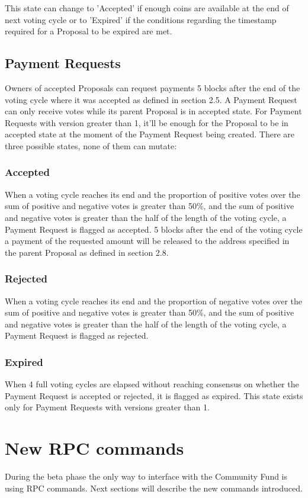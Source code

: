 \documentclass{artikel1}
\begin{document}
\begin{flushleft}
This state can change to 'Accepted' if enough coins are available at the end of next voting cycle or to 'Expired' if the conditions regarding the timestamp required for a Proposal to be expired are met.
\subsection{Payment Requests}
Owners of accepted Proposals can request payments 5 blocks after the end of the voting cycle where it was accepted as defined in section 2.5. A Payment Request can only receive votes while its parent Proposal is in accepted state. For Payment Requests with version greater than 1, it'll be enough for the Proposal to be in accepted state at the moment of the Payment Request being created. There are three possible states, none of them can mutate:
\subsubsection{Accepted}
When a voting cycle reaches its end and the proportion of positive votes over the sum of positive and negative votes is greater than 50\%, and the sum of positive and negative votes is greater than the half of the length of the voting cycle, a Payment Request is flagged as accepted. 5 blocks after the end of the voting cycle a payment of the requested amount will be released to the address specified in the parent Proposal as defined in section 2.8.
\subsubsection{Rejected}
When a voting cycle reaches its end and the proportion of negative votes over the sum of positive and negative votes is greater than 50\%, and the sum of positive and negative votes is greater than the half of the length of the voting cycle, a Payment Request is flagged as rejected.
\subsubsection{Expired}
When 4 full voting cycles are elapsed without reaching consensus on whether the Payment Request is accepted or rejected, it is flagged as expired. This state exists only for Payment Requests with versions greater than 1.
\section{New RPC commands}
During the beta phase the only way to interface with the Community Fund is using RPC commands. Next sections will describe the new commands introduced.

\end{flushleft}
\end{document}
